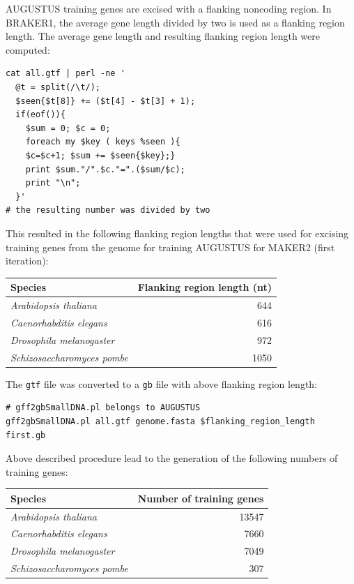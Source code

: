 \documentclass[a4paper,10pt]{report}
\begin{document}
\noindent AUGUSTUS training genes are excised with a flanking noncoding region. In BRAKER1, the average gene length divided by two is used as a flanking region length. The average gene length and resulting flanking region length were computed:

\begin{verbatim}
cat all.gtf | perl -ne '
  @t = split(/\t/);
  $seen{$t[8]} += ($t[4] - $t[3] + 1); 
  if(eof()){
    $sum = 0; $c = 0; 
    foreach my $key ( keys %seen ){
    $c=$c+1; $sum += $seen{$key};} 
    print $sum."/".$c."=".($sum/$c); 
    print "\n";
  }'
# the resulting number was divided by two
\end{verbatim}

\noindent This resulted in the following flanking region lengths that were used for excising training genes from the genome for training AUGUSTUS for MAKER2 (first iteration):\\

\begin{center}
\begin{tabular}{l r}
\hline
Species & Flanking region length (nt)\\
\hline
\textit{Arabidopsis thaliana} & 644\\
\textit{Caenorhabditis elegans} & 616\\
\textit{Drosophila melanogaster} & 972\\
\textit{Schizosaccharomyces pombe} & 1050\\
\hline
\end{tabular}
\end{center}

\noindent The \texttt{gtf} file was converted to a \texttt{gb} file with above flanking region length:\\

\begin{verbatim}
# gff2gbSmallDNA.pl belongs to AUGUSTUS
gff2gbSmallDNA.pl all.gtf genome.fasta $flanking_region_length first.gb
\end{verbatim}

\noindent Above described procedure lead to the generation of the following numbers of training genes:

\begin{center}
\begin{tabular}{l r}
\hline
Species & Number of training genes\\
\hline
\textit{Arabidopsis thaliana} & 13547\\
\textit{Caenorhabditis elegans} & 7660\\
\textit{Drosophila melanogaster} & 7049\\
\textit{Schizosaccharomyces pombe} & 307\\
\hline
\end{tabular}
\end{center}
\end{document}
